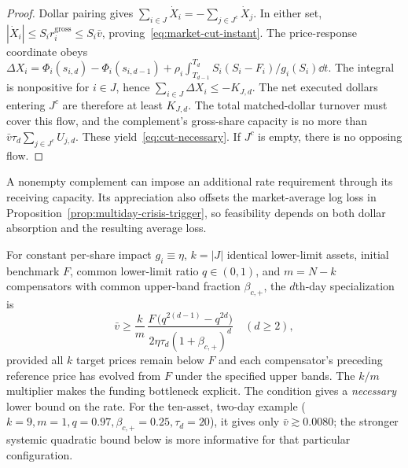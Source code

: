 \documentclass[review,hidelinks,onefignum,onetabnum]{siamonline250211}
\begin{document}
\begin{proof}
Dollar pairing gives $\sum_{i\in J}\dot X_i=-\sum_{j\in J^c}\dot X_j$. In either set, $|\dot X_i|\le S_i r_i^{\mathrm{gross}}\le S_i\bar v$, proving~\eqref{eq:market-cut-instant}. The price-response coordinate obeys
$\Delta X_i=\Phi_i(s_{i,d})-\Phi_i(s_{i,d-1})+
\rho_i\int_{T_{d-1}}^{T_d}S_i(S_i-F_i)/g_i(S_i)\dd t$.
The integral is nonpositive for $i\in J$, hence $\sum_{i\in J}\Delta X_i\le-K_{J,d}$. The net executed dollars entering $J^c$ are therefore at least $K_{J,d}$. The total matched-dollar turnover must cover this flow, and the complement's gross-share capacity is no more than $\bar v\tau_d\sum_{j\in J^c}U_{j,d}$. These yield~\eqref{eq:cut-necessary}. If $J^c$ is empty, there is no opposing flow.
\end{proof}
A nonempty complement can impose an additional rate requirement through its receiving capacity. Its appreciation also offsets the market-average log loss in Proposition~\ref{prop:multiday-crisis-trigger}, so feasibility depends on both dollar absorption and the resulting average loss.

For constant per-share impact $g_i\equiv\eta$, $k=|J|$ identical lower-limit assets, initial benchmark $F$, common lower-limit ratio $q\in(0,1)$, and $m=N-k$ compensators with common upper-band fraction $\beta_{c,+}$, the $d$th-day specialization is
\begin{equation}\label{eq:cut-special}
\bar v\ge \frac{k}{m}\,
\frac{F\,\big(q^{2(d-1)}-q^{2d}\big)}{2\eta\tau_d(1+\beta_{c,+})^{d}}\quad(d\ge2),
\end{equation}
provided all $k$ target prices remain below $F$ and each compensator's preceding reference price has evolved from $F$ under the specified upper bands. The $k/m$ multiplier makes the funding bottleneck explicit. The condition gives a \emph{necessary} lower bound on the rate. For the ten-asset, two-day example ($k=9,m=1,q=0.97,\beta_{c,+}=0.25,\tau_d=20$), it gives only $\bar v\gtrsim 0.0080$; the stronger systemic quadratic bound below is more informative for that particular configuration.
\end{document}
